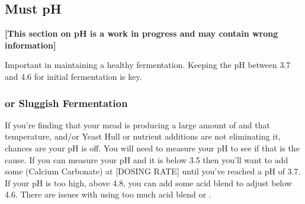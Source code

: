 \documentclass{article}
\begin{document}
 \subsection{Must pH}
\textbf{[This section on pH is a work in progress and may contain wrong information]}

  Important in maintaining a healthy fermentation. Keeping the pH between 3.7 and 4.6 for initial fermentation is 
  key.

  \subsubsection{ or Sluggish Fermentation}
   If you're finding that your mead is producing a large amount of  and that temperature, and/or Yeast 
   Hull or nutrient additions are not eliminating it, chances are your pH is off. You will need to measure your 
   pH to see if that is the cause. If you can measure your pH and it is
   below 3.5 then you'll want to add some  (Calcium Carbonate) at [DOSING RATE] until you've reached
   a pH of 3.7. If your pH is too high, above 4.8, 
   you can add some acid blend to adjust below 4.6. There are issues with using too much acid blend or .
\end{document}
